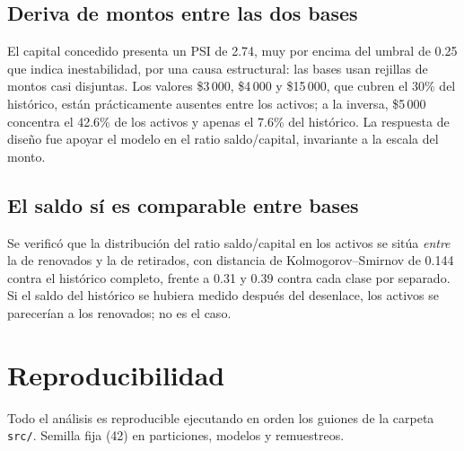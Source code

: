 \documentclass[11pt,a4paper]{article}
\begin{document}
\subsection*{Deriva de montos entre las dos bases}

El capital concedido presenta un PSI de 2.74, muy por encima del umbral de 0.25
que indica inestabilidad, por una causa estructural: las bases usan rejillas de
montos casi disjuntas. Los valores \$3\,000, \$4\,000 y \$15\,000, que cubren el
30\% del histórico, están prácticamente ausentes entre los activos; a la inversa,
\$5\,000 concentra el 42.6\% de los activos y apenas el 7.6\% del histórico. La
respuesta de diseño fue apoyar el modelo en el ratio saldo/capital, invariante a
la escala del monto.

\subsection*{El saldo sí es comparable entre bases}

Se verificó que la distribución del ratio saldo/capital en los activos se sitúa
\emph{entre} la de renovados y la de retirados, con distancia de
Kolmogorov--Smirnov de 0.144 contra el histórico completo, frente a 0.31 y 0.39
contra cada clase por separado. Si el saldo del histórico se hubiera medido
después del desenlace, los activos se parecerían a los renovados; no es el caso.

\clearpage
\section{Reproducibilidad}

Todo el análisis es reproducible ejecutando en orden los guiones de la carpeta
\texttt{src/}. Semilla fija (42) en particiones, modelos y remuestreos.
\end{document}
